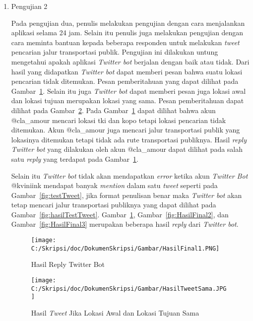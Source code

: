 \begin{enumerate}
	\item Pengujian 2
	
	Pada pengujian dua, penulis melakukan pengujian dengan cara menjalankan aplikasi selama 24 jam. Selain itu penulis juga melakukan pengujian dengan cara meminta bantuan kepada beberapa responden untuk melakukan \textit{tweet} pencarian jalur transportasi publik. Pengujian ini dilakukan untung mengetahui apakah aplikasi \textit{Twitter bot} berjalan dengan baik atau tidak. Dari hasil yang didapatkan \textit{Twitter bot} dapat memberi pesan bahwa suatu lokasi pencarian tidak ditemukan. Pesan pemberitahuan yang dapat dilihat pada Gambar~\ref{fig:HasilFinal1}. Selain itu juga \textit{Twitter bot} dapat memberi pesan juga lokasi awal dan lokasi tujuan merupakan lokasi yang sama. Pesan pemberitahuan dapat dilihat pada Gambar~\ref{fig:HasilTweetSama}.
	Pada Gambar~\ref{fig:HasilFinal1} dapat dilihat bahwa akun @cla\_amour mencari lokasi tki dan kopo tetapi lokasi pencarian tidak ditemukan. Akun @cla\_amour juga mencari jalur transportasi publik yang lokasinya ditemukan tetapi tidak ada rute transportasi publiknya. Hasil \textit{reply Twitter bot} yang dilakukan oleh akun @cla\_amour dapat dilihat pada salah satu \textit{reply} yang terdapat pada Gambar~\ref{fig:HasilFinal1}.
	
	Selain itu \textit{Twitter bot} tidak akan mendapatkan \textit{error} ketika akun \textit{Twitter Bot} @kviniink mendapat banyak \textit{mention} dalam satu \textit{tweet} seperti pada Gambar~\ref{fig:testTweet}, jika format penulisan benar maka \textit{Twitter bot} akan tetap mencari jalur transportasi publiknya yang dapat dilihat pada Gambar~\ref{fig:hasilTestTweet}. 
	Gambar~\ref{fig:HasilFinal1}, Gambar~\ref{fig:HasilFinal2}, dan Gambar~\ref{fig:HasilFinal3} merupakan beberapa hasil \textit{reply} dari \textit{Twitter bot}.
	
	\newpage
	\begin{figure}
		\centering
			\texttt{[image: C:/Skripsi/doc/DokumenSkripsi/Gambar/HasilFinal1.PNG]}
		\caption{Hasil Reply Twitter Bot}
		\label{fig:HasilFinal1}
	\end{figure}
	
	\begin{figure}
		\centering
			\texttt{[image: C:/Skripsi/doc/DokumenSkripsi/Gambar/HasilTweetSama.JPG]}
		\caption{Hasil \textit{Tweet} Jika Lokasi Awal dan Lokasi Tujuan Sama}
		\label{fig:HasilTweetSama}
	\end{figure}
	

\end{enumerate}
